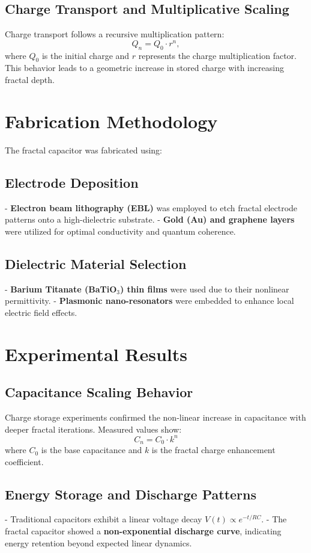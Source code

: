 \documentclass{article}
\theoremstyle{plain}
\begin{document}
\subsection{Charge Transport and Multiplicative Scaling}
Charge transport follows a recursive multiplication pattern:
\begin{equation}
    Q_n = Q_0 \cdot r^n,
\end{equation}
where $Q_0$ is the initial charge and $r$ represents the charge multiplication factor. This behavior leads to a geometric increase in stored charge with increasing fractal depth.

\section{Fabrication Methodology}
The fractal capacitor was fabricated using:
\subsection{Electrode Deposition}
- \textbf{Electron beam lithography (EBL)} was employed to etch fractal electrode patterns onto a high-dielectric substrate.
- \textbf{Gold (Au) and graphene layers} were utilized for optimal conductivity and quantum coherence.

\subsection{Dielectric Material Selection}
- \textbf{Barium Titanate (BaTiO$_3$) thin films} were used due to their nonlinear permittivity.
- \textbf{Plasmonic nano-resonators} were embedded to enhance local electric field effects.

\section{Experimental Results}
\subsection{Capacitance Scaling Behavior}
Charge storage experiments confirmed the non-linear increase in capacitance with deeper fractal iterations. Measured values show:
\begin{equation}
    C_n = C_0 \cdot k^n
\end{equation}
where $C_0$ is the base capacitance and $k$ is the fractal charge enhancement coefficient.

\subsection{Energy Storage and Discharge Patterns}
- Traditional capacitors exhibit a linear voltage decay $V(t) \propto e^{-t/RC}$.
- The fractal capacitor showed a \textbf{non-exponential discharge curve}, indicating energy retention beyond expected linear dynamics.
\end{document}
